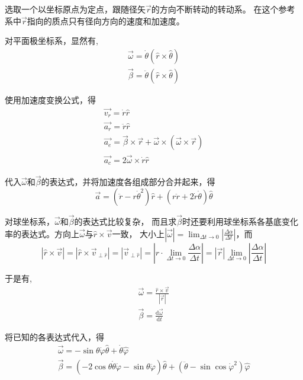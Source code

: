 \documentclass{ctexart}
\begin{document}
    选取一个以坐标原点为定点，跟随径矢$\vec{r}$的方向不断转动的转动系。
    在这个参考系中$\vec{r}$指向的质点只有径向方向的速度和加速度。

    对平面极坐标系，显然有,
    \begin{gather*}
        \vec{\omega} = \dot{\theta}(\hat{r}\times\hat{\theta}) \\
        \vec{\beta} = \ddot{\theta}(\hat{r}\times\hat{\theta})
    \end{gather*}

    使用加速度变换公式，得
    \begin{gather}
        \vec{v_r} = \dot{r}\hat{r} \label{eq:1} \\
        \vec{a_r} = \ddot{r}\hat{r} \label{eq:2} \\
        \vec{a_e} = \vec{\beta}\times\vec{r}+\vec{\omega}\times(\vec{\omega}\times\vec{r})
        \label{eq:3} \\
        \vec{a_c} = 2\vec{\omega}\times\dot{r}\hat{r} \label{eq:4}
    \end{gather}

    代入$\vec{\omega}$和$\vec{\beta}$的表达式，并将加速度各组成部分合并起来，得
    \begin{equation*}
        \vec{a} = (\ddot{r}-r\dot{\theta}^2)\hat{r}+(r\ddot{r}+2\dot{r}\dot{\theta})\hat{\theta}
    \end{equation*}

    对球坐标系，$\vec{\omega}$和$\vec{\beta}$的表达式比较复杂，
    而且求$\vec{\beta}$时还要利用球坐标系各基底变化率的表达式。方向上$\vec{\omega}$与$\hat{r}\times\vec{v}$一致，
    大小上$|\vec{\omega}| = \lim_{\Delta t \to 0}|\frac{\Delta\alpha}{\Delta t}|$，而
    \begin{equation*}
        |\hat{r}\times\vec{v}| = |\hat{r}\times\vec{v}_{\perp\hat{r}}| =
        |\vec{v}_{\perp\hat{r}}| =
        |r\cdot\lim_{\Delta t \to 0}\frac{\Delta\alpha}{\Delta t}| =
        |\vec{r}|\lim_{\Delta t \to 0}|\frac{\Delta\alpha}{\Delta t}|
    \end{equation*}

    于是有,
    \begin{gather*}
        \vec{\omega} = \frac{\hat{r}\times\vec{v}}{|\vec{r}|} \\
        \vec{\beta} = \frac{\mathrm{d}\vec{\omega}}{\mathrm{d}t}
    \end{gather*}

    将已知的各表达式代入，得
    \begin{gather*}
        \vec{\omega} = -\sin\theta\dot{\varphi}\hat{\theta}+\dot{\theta}\hat{\varphi} \\
        \vec{\beta} = (-2\cos\theta\dot{\theta}\dot{\varphi}-\sin\theta\ddot{\varphi})\hat{\theta}+
        (\ddot{\theta}-\sin\cos\dot{\varphi}^2)\hat{\varphi}
    \end{gather*}
\end{document}
